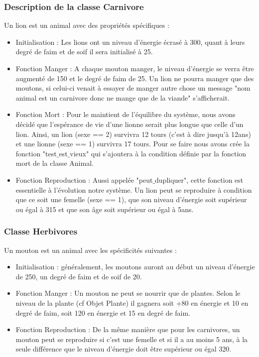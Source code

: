 \documentclass[a4paper,12pt]{article} %
\begin{document}
\subsubsection{Description de la classe Carnivore}
Un lion est un animal avec des propriétés spécifiques :
\begin{itemize}
    \item Initialisation : Les lions ont un niveau d'énergie écrasé à 300, quant à leurs degré de faim et de soif il sera initialisé à 25.
    
    \item Fonction Manger : A chaque mouton manger, le niveau d'énergie se verra être augmenté de 150 et le degré de faim de 25. Un lion ne pourra manger que des moutons, si celui-ci venait à essayer de manger autre chose un message "nom animal est un carnivore donc ne mange que de la viande" s'afficherait.
    
    \item Fonction Mort : Pour le maintient de l'équilibre du système, nous avons décidé que l'espérance de vie d'une lionne serait plus longue que celle d'un lion. Ainsi, un lion (sexe == 2) survivra 12 tours (c'est à dire jusqu'à 12ans) et une lionne (sexe == 1) survivra 17 tours. Pour se faire nous avons crée la fonction "test$\_$est$\_$vieux" qui s'ajoutera à la condition définie par la fonction mort de la classe Animal.
    
    \item Fonction Reproduction : Aussi appelée "peut$\_$dupliquer", cette fonction est essentielle à l'évolution notre système. Un lion peut se reproduire à condition que ce soit une femelle (sexe == 1), que son niveau d'énergie soit supérieur ou égal à 315 et que son âge soit supérieur ou égal à 5ans. 
    
\end{itemize}

\subsubsection{Classe Herbivores}
Un mouton est un animal avec les spécificités suivantes :
\begin{itemize}
    \item Initialisation : généralement, les moutons auront au début un niveau d'énergie de 250, un degré de faim et de soif de 20.
    
    \item Fonction Manger : Un mouton ne peut se nourrir que de plantes. Selon le niveau de la plante (cf Objet Plante) il gagnera soit +80 en énergie et 10 en degré de faim, soit 120 en énergie et 15 en degré de faim.
    
    \item Fonction Reproduction : De la même manière que pour les carnivores, un mouton peut se reproduire si c'est une femelle et si il a au moins 5 ans, à la seule différence que le niveau d'énergie doit être supérieur ou égal 320.   
\end{itemize}
\end{document}
